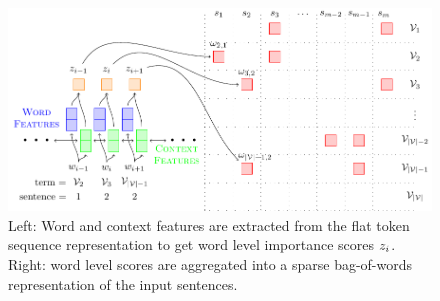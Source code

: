 \begin{figure}
 \begin{center}
  \includegraphics[scale=.7]{dl_based_salience_models/figures/4_2_wimp_model.pdf}
 \end{center}
\caption{Left: Word and context features are extracted from the flat token
sequence representation to get word level importance scores 
$z_i$. Right: word level scores are aggregated into a sparse
bag-of-words representation of the input sentences.}
\end{figure}
